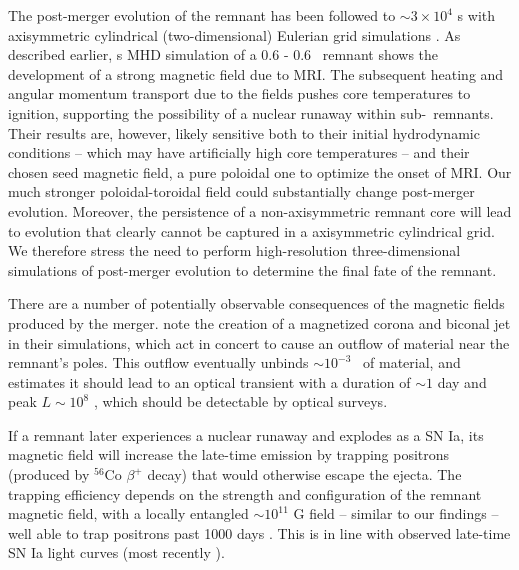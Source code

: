 The post-merger evolution of the remnant has been followed to $\sim3\times10^4$ s with axisymmetric cylindrical (two-dimensional) Eulerian grid simulations \citep{schw+12,ji+13}.  As described earlier, \cite{ji+13}s MHD simulation of a 0.6 - 0.6 \Msun\ remnant shows the development of a strong magnetic field due to MRI.  The subsequent heating and angular momentum transport due to the fields pushes core temperatures to ignition, supporting the possibility of a nuclear runaway within sub-\Mch\ remnants.  Their results are, however, likely sensitive both to their initial hydrodynamic conditions -- which may have artificially high core temperatures -- and their chosen seed magnetic field, a pure poloidal one to optimize the onset of MRI.  Our much stronger poloidal-toroidal field could substantially change post-merger evolution.  Moreover, the persistence of a non-axisymmetric remnant core will lead to evolution that clearly cannot be captured in a axisymmetric cylindrical grid.  We therefore stress the need to perform high-resolution three-dimensional simulations of post-merger evolution to determine the final fate of the remnant.


There are a number of potentially observable consequences of the magnetic fields produced by the merger.  \cite{ji+13} note the creation of a magnetized corona and biconal jet in their simulations, which act in concert to cause an outflow of material near the remnant's poles.  This outflow eventually unbinds $\sim10^{-3}$ \Msun\ of material, and \cite{belo14} estimates it should lead to an optical transient with a duration of $\sim1$ day and peak $L \sim10^{8}$ \Lsun, which should be detectable by optical surveys.

If a remnant later experiences a nuclear runaway and explodes as a SN Ia, its magnetic field will increase the late-time emission by trapping positrons (produced by $^{56}$Co $\beta^+$ decay) that would otherwise escape the ejecta.  The trapping efficiency depends on the strength and configuration of the remnant magnetic field, with a locally entangled $\sim10^{11}$ G field -- similar to our findings -- well able to trap positrons past 1000 days \citep{ruizs98}.  This is in line with observed late-time SN Ia light curves (most recently \citealt{kerz+14}).

